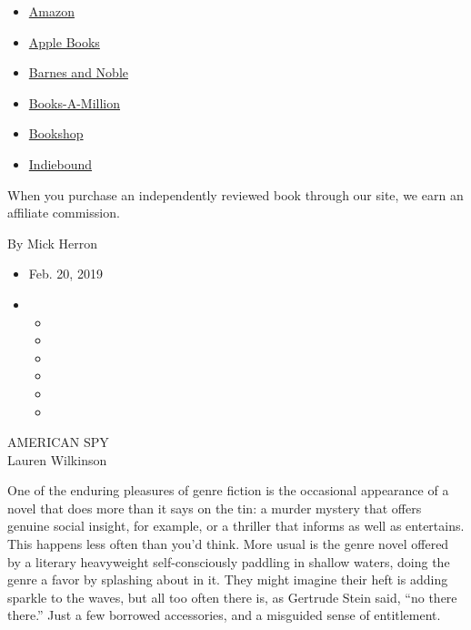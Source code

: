 \begin{itemize}
\tightlist
\item
  \href{https://www.amazon.com/gp/search?index=books\&tag=NYTBSREV-20\&field-keywords=American+Spy+Lauren+Wilkinson}{Amazon}
\item
  \href{https://du-gae-books-dot-nyt-du-prd.appspot.com/buy?title=American+Spy\&author=Lauren+Wilkinson}{Apple
  Books}
\item
  \href{https://www.anrdoezrs.net/click-7990613-11819508?url=https\%3A\%2F\%2Fwww.barnesandnoble.com\%2Fw\%2F\%3Fean\%3D9780812998955}{Barnes
  and Noble}
\item
  \href{https://www.anrdoezrs.net/click-7990613-35140?url=https\%3A\%2F\%2Fwww.booksamillion.com\%2Fp\%2FAmerican\%2BSpy\%2FLauren\%2BWilkinson\%2F9780812998955}{Books-A-Million}
\item
  \href{https://bookshop.org/a/3546/9780812998955}{Bookshop}
\item
  \href{https://www.indiebound.org/book/9780812998955?aff=NYT}{Indiebound}
\end{itemize}

When you purchase an independently reviewed book through our site, we
earn an affiliate commission.

By Mick Herron

\begin{itemize}
\item
  Feb. 20, 2019
\item
  \begin{itemize}
  \item
  \item
  \item
  \item
  \item
  \item
  \end{itemize}
\end{itemize}

AMERICAN SPY\\
Lauren Wilkinson

One of the enduring pleasures of genre fiction is the occasional
appearance of a novel that does more than it says on the tin: a murder
mystery that offers genuine social insight, for example, or a thriller
that informs as well as entertains. This happens less often than you'd
think. More usual is the genre novel offered by a literary heavyweight
self-consciously paddling in shallow waters, doing the genre a favor by
splashing about in it. They might imagine their heft is adding sparkle
to the waves, but all too often there is, as Gertrude Stein said, ``no
there there.'' Just a few borrowed accessories, and a misguided sense of
entitlement.


